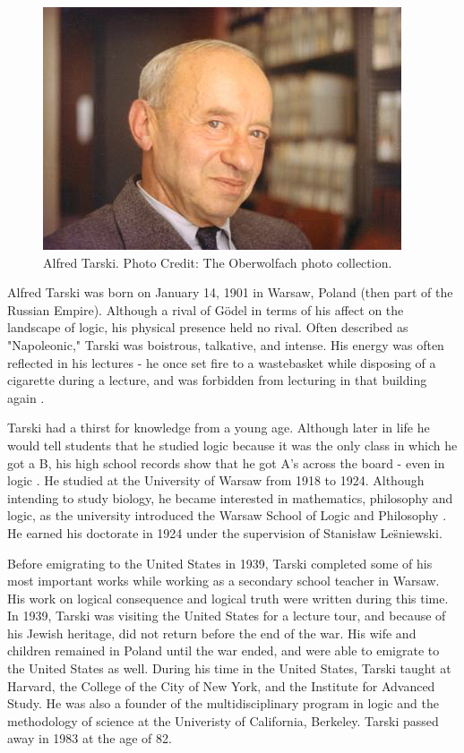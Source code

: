\documentclass[../../../include/open-logic-section]{subfiles}
\begin{document}

\begin{figure}[h!] 
\centering
\includegraphics[scale=0.5]{alfredtarski.jpeg} 
\caption{Alfred Tarski. Photo Credit: The Oberwolfach photo collection.} 
\end{figure}

Alfred Tarski was born on January 14, 1901 in Warsaw, Poland (then part
of the Russian Empire). Although a rival of G\"{o}del in terms of his affect on the 
landscape of logic, his physical presence held no rival. Often described as 
"Napoleonic," Tarski was boistrous, talkative, and intense. His energy was often
reflected in his lectures - he once set  fire to a wastebasket while disposing of a
cigarette during a lecture, and was forbidden from lecturing in that building again
\citep[2]{feferman2004}. 

Tarski had a thirst for knowledge from a young age. Although later in life he would
tell students that he studied logic because it was the only class in which he got a B,
his high school records show that he got A's across the board - even in logic 
\citep[18]{feferman2004}. He studied at the University of Warsaw from 1918 to 1924.
Although intending to study biology, he became interested in mathematics, philosophy
and  logic, as the university introduced the Warsaw School of Logic and Philosophy
\cite[30]{feferman2004}. He earned his doctorate in 1924 under the supervision of 
Stanisław Le\"{s}niewski.

Before emigrating to the United States in 1939, Tarski completed some of his most
 important works while working as a secondary school teacher in Warsaw. His work
 on logical consequence and logical truth were written during this time. In 1939, Tarski
 was visiting the United States for a lecture tour, and because of his Jewish heritage,
 did not return before the end of the war. His wife and children remained in Poland
 until the war ended, and were able to emigrate to the United States as well. During 
 his time in the United States, Tarski taught at Harvard, the College of the City of New
 York, and the Institute for Advanced Study. He was also a founder of the multidisciplinary
 program in logic and the methodology of science at the Univeristy of California, Berkeley.
 Tarski passed away in 1983 at the age of 82.
\end{document}
